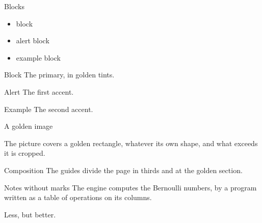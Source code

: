 \documentclass[11pt]{beamer}
\begin{document}
\begin{frame}[label=blocks]{Blocks}
  \begin{goldencolumns}[minor]
    \begin{itemize}
      \item block
      \item alert block
      \item example block
    \end{itemize}
    \nextcolumn
    \begin{block}{Block}
      The primary, in golden tints.
    \end{block}
    \begin{alertblock}{Alert}
      The first accent.
    \end{alertblock}
    \begin{exampleblock}{Example}
      The second accent.
    \end{exampleblock}
  \end{goldencolumns}
\end{frame}

\begin{frame}[label=image]{A golden image}
  \begin{goldencolumns}
    \nextcolumn
    The picture covers a golden rectangle, whatever its own shape, and what
    exceeds it is cropped.
  \end{goldencolumns}
\end{frame}

\begin{frame}[label=plain]{Composition}
  The guides divide the page in thirds and at the golden section.
\end{frame}

\begin{frame}[label=notes]{Notes without marks}
  The engine computes the Bernoulli numbers, by a program written as a table
  of operations on its columns.
\end{frame}

\begin{frame}[standout,label=standout]
  Less, but better.
\end{frame}
\end{document}
